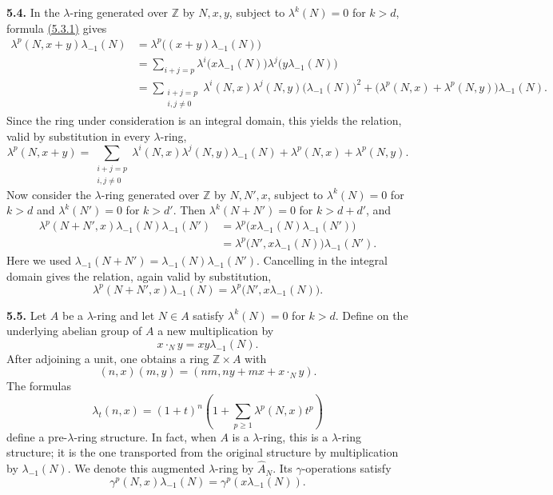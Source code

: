 \textbf{5.4.} In the \(\lambda\)-ring generated over \(\mathbb Z\) by \(N,x,y\), subject to \(\lambda^k(N)=0\) for \(k>d\), formula \hyperlink{sga6.e05.eq.5-3-1}{(5.3.1)} gives
\begin{align*}
 \lambda^p(N,x+y)\lambda_{-1}(N)
 &=\lambda^p\bigl((x+y)\lambda_{-1}(N)\bigr)\\
 &=\sum_{i+j=p}
   \lambda^i\bigl(x\lambda_{-1}(N)\bigr)
   \lambda^j\bigl(y\lambda_{-1}(N)\bigr)\\
 &=\sum_{\substack{i+j=p\\ i,j\ne0}}
   \lambda^i(N,x)\lambda^j(N,y)\bigl(\lambda_{-1}(N)\bigr)^2
   +\bigl(\lambda^p(N,x)+\lambda^p(N,y)\bigr)\lambda_{-1}(N).
\end{align*}
Since the ring under consideration is an integral domain, this yields the relation, valid by substitution in every \(\lambda\)-ring,
\begin{equation}\tag{5.4.1}
 \lambda^p(N,x+y)
 =\sum_{\substack{i+j=p\\ i,j\ne0}}
   \lambda^i(N,x)\lambda^j(N,y)\lambda_{-1}(N)
   +\lambda^p(N,x)+\lambda^p(N,y).
\end{equation}
Now consider the \(\lambda\)-ring generated over \(\mathbb Z\) by \(N,N',x\), subject to \(\lambda^k(N)=0\) for \(k>d\) and \(\lambda^k(N')=0\) for \(k>d'\). Then \(\lambda^k(N+N')=0\) for \(k>d+d'\), and
\begin{align*}
 \lambda^p(N+N',x)\lambda_{-1}(N)\lambda_{-1}(N')
 &=\lambda^p\bigl(x\lambda_{-1}(N)\lambda_{-1}(N')\bigr)\\
 &=\lambda^p\bigl(N',x\lambda_{-1}(N)\bigr)\lambda_{-1}(N').
\end{align*}
Here we used \(\lambda_{-1}(N+N')=\lambda_{-1}(N)\lambda_{-1}(N')\). Cancelling in the integral domain gives the relation, again valid by substitution,
\begin{equation}\tag{5.4.2}
  \lambda^p(N+N',x)\lambda_{-1}(N)
  =\lambda^p\bigl(N',x\lambda_{-1}(N)\bigr).
\end{equation}

\textbf{5.5.} Let \(A\) be a \(\lambda\)-ring and let \(N\in A\) satisfy \(\lambda^k(N)=0\) for \(k>d\). Define on the underlying abelian group of \(A\) a new multiplication by
\[
  x\cdot_N y=xy\lambda_{-1}(N).
\]
After adjoining a unit, one obtains a ring \(\mathbb Z\times A\) with
\[
  (n,x)(m,y)=(nm,ny+mx+x\cdot_N y).
\]
The formulas
\begin{equation}\tag{5.5.1}
  \lambda_t(n,x)=(1+t)^n\left(1+
  \sum_{p\ge1}\lambda^p(N,x)t^p\right)
\end{equation}
define a pre-\(\lambda\)-ring structure. In fact, when \(A\) is a \(\lambda\)-ring, this is a \(\lambda\)-ring structure; it is the one transported from the original structure by multiplication by \(\lambda_{-1}(N)\). We denote this augmented \(\lambda\)-ring by \(\widehat A_N\). Its \(\gamma\)-operations satisfy
\begin{equation}\tag{5.5.2}
  \gamma^p(N,x)\lambda_{-1}(N)=\gamma^p(x\lambda_{-1}(N)).
\end{equation}

